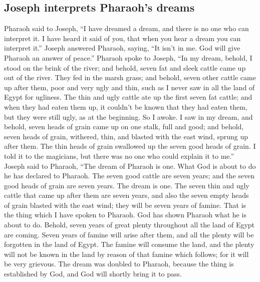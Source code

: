\hypertarget{joseph-interprets-pharaohs-dreams}{%
\subsection{Joseph interprets Pharaoh's
dreams}\label{joseph-interprets-pharaohs-dreams}}

 Pharaoh said to Joseph, ``I have dreamed a dream, and
there is no one who can interpret it. I have heard it said of you, that
when you hear a dream you can interpret it.''  Joseph
answered Pharaoh, saying, ``It isn't in me. God will give Pharaoh an
answer of peace.''  Pharaoh spoke to Joseph, ``In my
dream, behold, I stood on the brink of the river;  and
behold, seven fat and sleek cattle came up out of the river. They fed in
the marsh grass;  and behold, seven other cattle came up
after them, poor and very ugly and thin, such as I never saw in all the
land of Egypt for ugliness.  The thin and ugly cattle ate
up the first seven fat cattle;  and when they had eaten
them up, it couldn't be known that they had eaten them, but they were
still ugly, as at the beginning. So I awoke.  I saw in my
dream, and behold, seven heads of grain came up on one stalk, full and
good;  and behold, seven heads of grain, withered, thin,
and blasted with the east wind, sprung up after them. 
The thin heads of grain swallowed up the seven good heads of grain. I
told it to the magicians, but there was no one who could explain it to
me.''  Joseph said to Pharaoh, ``The dream of Pharaoh is
one. What God is about to do he has declared to Pharaoh. 
The seven good cattle are seven years; and the seven good heads of grain
are seven years. The dream is one.  The seven thin and
ugly cattle that came up after them are seven years, and also the seven
empty heads of grain blasted with the east wind; they will be seven
years of famine.  That is the thing which I have spoken
to Pharaoh. God has shown Pharaoh what he is about to do.
 Behold, seven years of great plenty throughout all the
land of Egypt are coming.  Seven years of famine will
arise after them, and all the plenty will be forgotten in the land of
Egypt. The famine will consume the land,  and the plenty
will not be known in the land by reason of that famine which follows;
for it will be very grievous.  The dream was doubled to
Pharaoh, because the thing is established by God, and God will shortly
bring it to pass.

